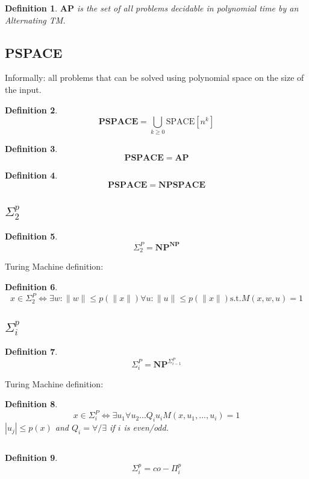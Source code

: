 \documentclass[]{article}
\theoremstyle{break}
\theoremstyle{break}
\newtheorem{definition}{Definition}[section]
\begin{document}
\begin{definition}
	$\mathbf{AP}$ is the set of all problems decidable in polynomial time by an Alternating TM.
\end{definition}

\subsection{PSPACE} \label{sec:PSPACE}

Informally: all problems that can be solved using polynomial space on the size of the input.

\begin{definition}
	$$\mathbf{PSPACE} = \bigcup_{k \geq 0} \hyperref[sec:SPACE]{\text{SPACE}[n^k]}$$
\end{definition}

\begin{definition}
	$$\mathbf{PSPACE} = \hyperref[sec:AP]{\mathbf{AP}}$$
\end{definition}

\begin{definition}
	$$\mathbf{PSPACE} = \hyperref[sec:NPSPACE]{\mathbf{NPSPACE}}$$
\end{definition}

\subsection{$\Sigma^p_2$}
\label{sec:sigmap2}
\begin{definition}
	$$\Sigma_2^P = \hyperref[sec:NP]{\textbf{NP}^{\textbf{NP}}}$$
\end{definition}
$ $
\\
Turing Machine definition:
\begin{definition}
	$$x \in \Sigma_2^P\iff \exists w : \|w\| \leq p(\|x\|) \forall u : \|u\| \leq p(\|x\|)\text{s.t.} M(x, w,u) = 1$$
\end{definition}
\subsection{$\Sigma^p_i$}
\label{sec:sigmapi}
\begin{definition}
	$$\Sigma_i^P = \hyperref[sec:NP]{\textbf{NP}}^{\hyperref[sec:sigmapi]{\Sigma_{i-1}^P}}$$
\end{definition}
$ $
\\
Turing Machine definition:
\begin{definition}
	$$x \in \Sigma_i^P\iff \exists u_1\forall u_2 ... Q_i u_i M(x,u_1,...,u_i) = 1$$
	$|u_j| \leq p(x)$ and $Q_i=\forall/\exists$ if $i$ is even/odd.
\end{definition}
$ $
\\
\begin{definition}
	$$\Sigma_i^p ={\hyperref[sec:pipi]{co-\Pi_{i}^p}}$$
\end{definition}
\end{document}

